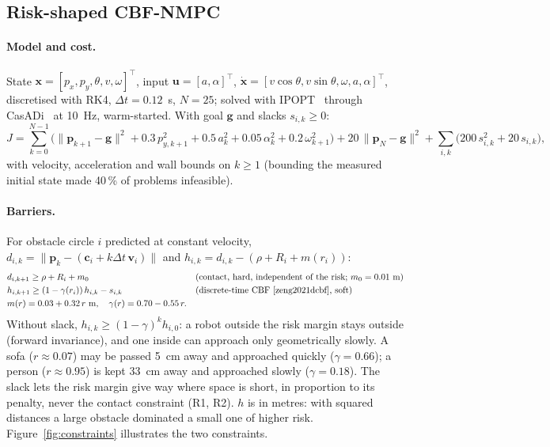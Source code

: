 \documentclass[10pt,a4paper]{article}
\begin{document}
\subsection{Risk-shaped CBF-NMPC}\label{sec:nmpc}

\paragraph{Model and cost.} State $\bm x=[p_x,p_y,\theta,v,\omega]^\top$, input $\bm u=[a,\alpha]^\top$,
$\dot{\bm x}=[v\cos\theta,v\sin\theta,\omega,a,\alpha]^\top$, discretised with RK4, $\Delta t=0.12$~s, $N=25$; solved with
IPOPT~\cite{waechter2006ipopt} through CasADi~\cite{andersson2019casadi} at 10~Hz, warm-started. With goal $\bm g$ and slacks
$s_{i,k}\geq0$:
\begin{equation}
J=\sum_{k=0}^{N-1}\Big(\|\bm p_{k+1}-\bm g\|^2 + 0.3\,p_{y,k+1}^2 + 0.5\,a_k^2 + 0.05\,\alpha_k^2 + 0.2\,\omega_{k+1}^2\Big)
+ 20\,\|\bm p_N-\bm g\|^2 + \sum_{i,k}\big(200\,s_{i,k}^2 + 20\,s_{i,k}\big),
\end{equation}
with velocity, acceleration and wall bounds on $k\geq1$ (bounding the measured initial state made 40\,\% of problems infeasible).

\paragraph{Barriers.} For obstacle circle $i$ predicted at constant velocity,
$d_{i,k}=\|\bm p_k-(\bm c_i+k\Delta t\,\bm v_i)\|$ and $h_{i,k}=d_{i,k}-(\rho+R_i+m(r_i))$:
\begin{align}
&d_{i,k+1}\geq\rho+R_i+m_0 &&\text{(contact, hard, independent of the risk; } m_0=0.01\text{ m)}\\
&h_{i,k+1}\geq(1-\gamma(r_i))\,h_{i,k}-s_{i,k} &&\text{(discrete-time CBF~\cite{zeng2021dcbf}, soft)}\\
&m(r)=0.03+0.32\,r\text{ m},\quad \gamma(r)=0.70-0.55\,r. &&
\end{align}
Without slack, $h_{i,k}\geq(1-\gamma)^k h_{i,0}$: a robot outside the risk margin stays outside (forward invariance), and one inside
can approach only geometrically slowly. A sofa ($r\approx0.07$) may be passed 5~cm away and approached quickly ($\gamma=0.66$); a
person ($r\approx0.95$) is kept 33~cm away and approached slowly ($\gamma=0.18$). The slack lets the risk margin give way where space
is short, in proportion to its penalty, never the contact constraint (R1, R2). $h$ is in metres: with squared distances a large
obstacle dominated a small one of higher risk. Figure~\ref{fig:constraints} illustrates the two constraints.
\end{document}
